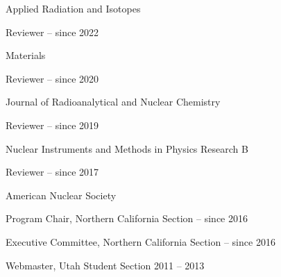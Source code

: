 \begin{list1}
\item[] Applied Radiation and Isotopes
\begin{list2}
\item Reviewer \hfill{ -- since 2022}
\end{list2}
\item[] Materials
\begin{list2}
\item Reviewer \hfill{ -- since 2020}
\end{list2}
\item[] Journal of Radioanalytical and Nuclear Chemistry
\begin{list2}
\item Reviewer \hfill{ -- since 2019}
\end{list2}
\item[] Nuclear Instruments and Methods in Physics Research B  
\begin{list2}
\item Reviewer \hfill{ -- since 2017}
\end{list2}
\item[] American Nuclear Society  
\begin{list2}
\item Program Chair, Northern California Section \hfill{ -- since 2016}
\item Executive Committee, Northern California Section \hfill{ -- since 2016}
\item Webmaster, Utah Student Section \hfill{2011 --  2013}
\end{list2}
\end{list1}
